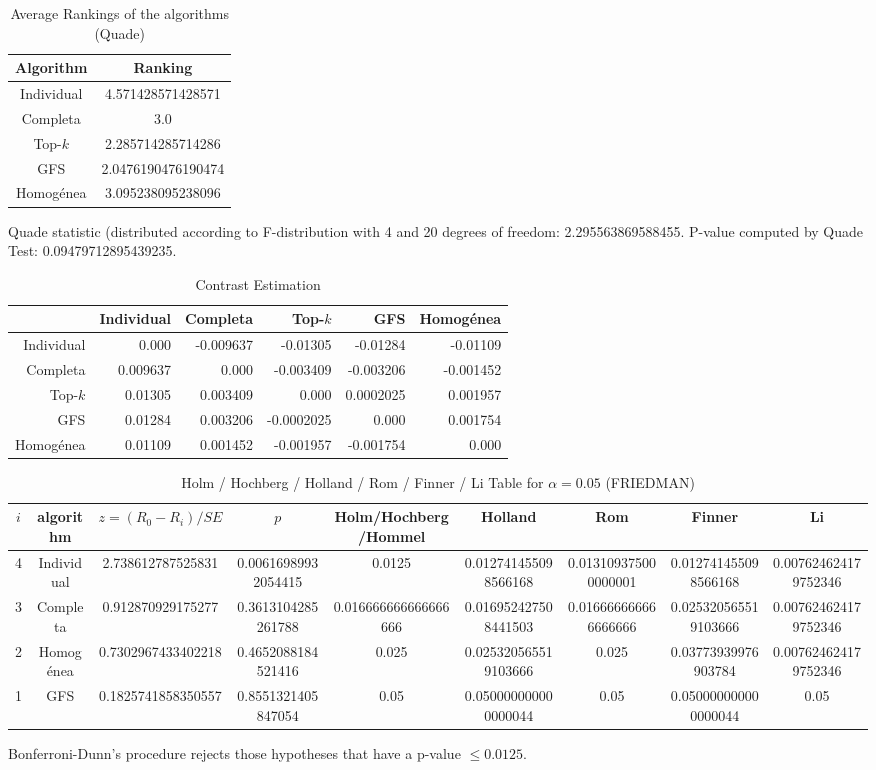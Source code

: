 \documentclass[a4paper,10pt]{article}
\begin{document}
\begin{landscape}
\newpage

\begin{table}[!htp]
\centering
\caption{Average Rankings of the algorithms (Quade)
}\begin{tabular}{c|c}
Algorithm&Ranking\\
\hline
Individual&4.571428571428571\\
Completa&3.0\\
Top-$k$&2.285714285714286\\
GFS&2.0476190476190474\\
Homogénea&3.095238095238096\\
\end{tabular}
\end{table}
Quade statistic (distributed according to F-distribution with 4 and 20 degrees of freedom: 2.295563869588455. 
P-value computed by Quade Test: 0.09479712895439235.\newline


\newpage

\begin{table}[!htp]
\centering\tiny
\caption{Contrast Estimation}
\begin{tabular}{
|r|r|r|r|r|r|}
\hline
 &Individual&Completa&Top-$k$&GFS&Homogénea\\
\hline
Individual&0.000&-0.009637&-0.01305&-0.01284&-0.01109\\
\hline
Completa&0.009637&0.000&-0.003409&-0.003206&-0.001452\\
\hline
Top-$k$&0.01305&0.003409&0.000&0.0002025&0.001957\\
\hline
GFS&0.01284&0.003206&-0.0002025&0.000&0.001754\\
\hline
Homogénea&0.01109&0.001452&-0.001957&-0.001754&0.000\\
\hline

\end{tabular}
\end{table}

\newpage

\begin{table}[!htp]
\centering\scriptsize
\caption{Holm / Hochberg / Holland / Rom / Finner / Li Table for $\alpha=0.05$ (FRIEDMAN)}
\begin{tabular}{ccccccccc}
$i$&algorithm&$z=(R_0 - R_i)/SE$&$p$&Holm/Hochberg/Hommel&Holland&Rom&Finner&Li\\
\hline
4&Individual&2.738612787525831&0.00616989932054415&0.0125&0.012741455098566168&0.013109375000000001&0.012741455098566168&0.007624624179752346\\
3&Completa&0.912870929175277&0.3613104285261788&0.016666666666666666&0.016952427508441503&0.016666666666666666&0.025320565519103666&0.007624624179752346\\
2&Homogénea&0.7302967433402218&0.4652088184521416&0.025&0.025320565519103666&0.025&0.03773939976903784&0.007624624179752346\\
1&GFS&0.1825741858350557&0.8551321405847054&0.05&0.050000000000000044&0.05&0.050000000000000044&0.05\\
\hline
\end{tabular}
\end{table}
Bonferroni-Dunn's procedure rejects those hypotheses that have a p-value $\le0.0125$.



\end{landscape}
\end{document}
